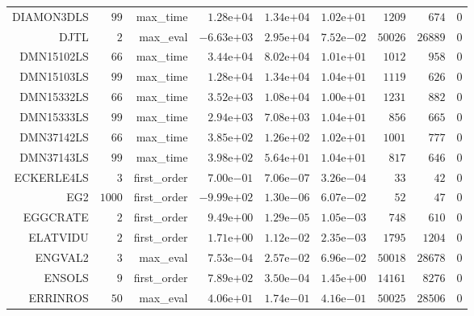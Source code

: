 \begin{longtable}{rrrrrrrrr}
DIAMON3DLS & \(    99\) & max\_time & \( 1.28\)e\(+04\) & \( 1.34\)e\(+04\) & \( 1.02\)e\(+01\) & \(  1209\) & \(   674\) & \(     0\) \\
DJTL & \(     2\) & max\_eval & \(-6.63\)e\(+03\) & \( 2.95\)e\(+04\) & \( 7.52\)e\(-02\) & \( 50026\) & \( 26889\) & \(     0\) \\
DMN15102LS & \(    66\) & max\_time & \( 3.44\)e\(+04\) & \( 8.02\)e\(+04\) & \( 1.01\)e\(+01\) & \(  1012\) & \(   958\) & \(     0\) \\
DMN15103LS & \(    99\) & max\_time & \( 1.28\)e\(+04\) & \( 1.34\)e\(+04\) & \( 1.04\)e\(+01\) & \(  1119\) & \(   626\) & \(     0\) \\
DMN15332LS & \(    66\) & max\_time & \( 3.52\)e\(+03\) & \( 1.08\)e\(+04\) & \( 1.00\)e\(+01\) & \(  1231\) & \(   882\) & \(     0\) \\
DMN15333LS & \(    99\) & max\_time & \( 2.94\)e\(+03\) & \( 7.08\)e\(+03\) & \( 1.04\)e\(+01\) & \(   856\) & \(   665\) & \(     0\) \\
DMN37142LS & \(    66\) & max\_time & \( 3.85\)e\(+02\) & \( 1.26\)e\(+02\) & \( 1.02\)e\(+01\) & \(  1001\) & \(   777\) & \(     0\) \\
DMN37143LS & \(    99\) & max\_time & \( 3.98\)e\(+02\) & \( 5.64\)e\(+01\) & \( 1.04\)e\(+01\) & \(   817\) & \(   646\) & \(     0\) \\
ECKERLE4LS & \(     3\) & first\_order & \( 7.00\)e\(-01\) & \( 7.06\)e\(-07\) & \( 3.26\)e\(-04\) & \(    33\) & \(    42\) & \(     0\) \\
EG2 & \(  1000\) & first\_order & \(-9.99\)e\(+02\) & \( 1.30\)e\(-06\) & \( 6.07\)e\(-02\) & \(    52\) & \(    47\) & \(     0\) \\
EGGCRATE & \(     2\) & first\_order & \( 9.49\)e\(+00\) & \( 1.29\)e\(-05\) & \( 1.05\)e\(-03\) & \(   748\) & \(   610\) & \(     0\) \\
ELATVIDU & \(     2\) & first\_order & \( 1.71\)e\(+00\) & \( 1.12\)e\(-02\) & \( 2.35\)e\(-03\) & \(  1795\) & \(  1204\) & \(     0\) \\
ENGVAL2 & \(     3\) & max\_eval & \( 7.53\)e\(-04\) & \( 2.57\)e\(-02\) & \( 6.96\)e\(-02\) & \( 50018\) & \( 28678\) & \(     0\) \\
ENSOLS & \(     9\) & first\_order & \( 7.89\)e\(+02\) & \( 3.50\)e\(-04\) & \( 1.45\)e\(+00\) & \( 14161\) & \(  8276\) & \(     0\) \\
ERRINROS & \(    50\) & max\_eval & \( 4.06\)e\(+01\) & \( 1.74\)e\(-01\) & \( 4.16\)e\(-01\) & \( 50025\) & \( 28506\) & \(     0\) \\

\end{longtable}
